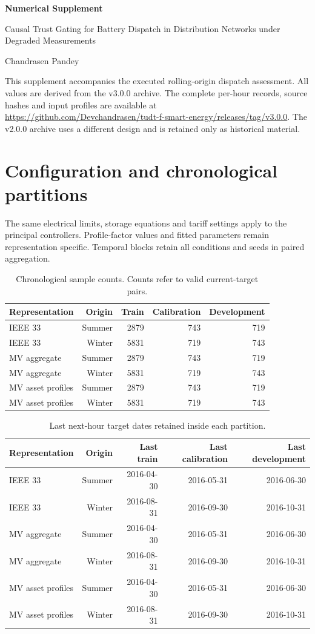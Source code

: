 \documentclass[11pt]{article}
\begin{document}
\begin{center}{\Large\bfseries Numerical Supplement}\par\medskip
Causal Trust Gating for Battery Dispatch in Distribution Networks under Degraded Measurements\par\smallskip Chandrasen Pandey\end{center}
This supplement accompanies the executed rolling-origin dispatch assessment. All values are derived from the v3.0.0 archive. The complete per-hour records, source hashes and input profiles are available at \url{https://github.com/Devchandrasen/tudt-f-smart-energy/releases/tag/v3.0.0}. The v2.0.0 archive uses a different design and is retained only as historical material.

\section{Configuration and chronological partitions}
The same electrical limits, storage equations and tariff settings apply to the principal controllers. Profile-factor values and fitted parameters remain representation specific. Temporal blocks retain all conditions and seeds in paired aggregation.
\begin{table}[H]
\centering\small\setlength{\tabcolsep}{3.5pt}
\caption{Chronological sample counts. Counts refer to valid current-target pairs.}\label{tab:split}
\begin{tabular}{lrrrr}
\toprule
Representation & Origin & Train & Calibration & Development\\\midrule
IEEE 33 & Summer & 2879 & 743 & 719\\
IEEE 33 & Winter & 5831 & 719 & 743\\
MV aggregate & Summer & 2879 & 743 & 719\\
MV aggregate & Winter & 5831 & 719 & 743\\
MV asset profiles & Summer & 2879 & 743 & 719\\
MV asset profiles & Winter & 5831 & 719 & 743\\
\bottomrule\end{tabular}
\end{table}
\begin{table}[H]
\centering\small\setlength{\tabcolsep}{3.5pt}
\caption{Last next-hour target dates retained inside each partition.}\label{tab:dates}
\begin{tabular}{lrrrr}
\toprule
Representation & Origin & Last train & Last calibration & Last development\\\midrule
IEEE 33 & Summer & 2016-04-30 & 2016-05-31 & 2016-06-30\\
IEEE 33 & Winter & 2016-08-31 & 2016-09-30 & 2016-10-31\\
MV aggregate & Summer & 2016-04-30 & 2016-05-31 & 2016-06-30\\
MV aggregate & Winter & 2016-08-31 & 2016-09-30 & 2016-10-31\\
MV asset profiles & Summer & 2016-04-30 & 2016-05-31 & 2016-06-30\\
MV asset profiles & Winter & 2016-08-31 & 2016-09-30 & 2016-10-31\\
\bottomrule\end{tabular}
\end{table}
\end{document}

